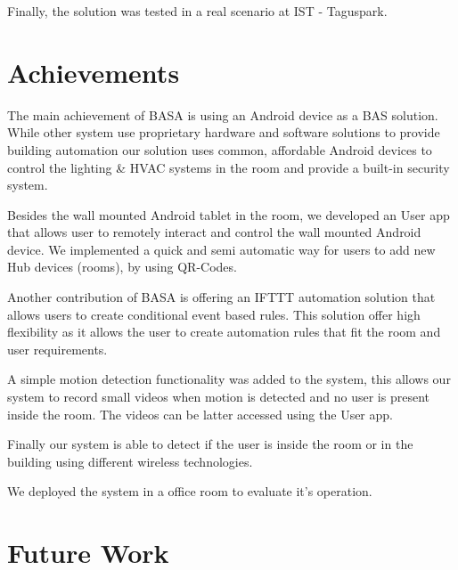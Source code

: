 Finally, the solution was tested in a real scenario  at \ac{IST} - Taguspark.


\section{Achievements}
\label{section:achievements}

The main achievement of BASA is using an Android device as a \ac{BAS} solution. While other system use proprietary hardware and software solutions to provide building automation our solution uses common, affordable Android devices to control the lighting \& \ac{HVAC} systems in the room and provide a built-in security system. 

Besides the wall mounted Android tablet in the room, we developed an User app that allows user to remotely interact and control the wall mounted Android device. We implemented a quick and semi automatic way for users to add new Hub devices (rooms), by using QR-Codes.


Another contribution of BASA is offering an \ac{IFTTT} automation solution that allows users to create conditional event based rules. This solution offer high flexibility as it allows the user to create automation rules that fit the room and user requirements.

A simple motion detection functionality was added to the system, this allows our system to record small videos when motion is detected and no user is present inside the room. The videos can be latter accessed using the User app.

Finally our system is able to detect if the user is inside the room or in the building using different wireless technologies.


We deployed the system in a office room to evaluate it's operation. 






\section{Future Work}
\label{section:future}

